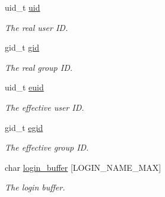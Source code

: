 \begin{DoxyCompactItemize}
\mbox{\label{structrtems__user__env__t_a6b4fe9690794c15883c40f553aa4bdaa}} 
uid\+\_\+t \mbox{\hyperlink{structrtems__user__env__t_a6b4fe9690794c15883c40f553aa4bdaa}{uid}}
\begin{DoxyCompactList}\small\item\em The real user ID. \end{DoxyCompactList}\item 
\mbox{\label{structrtems__user__env__t_a8f4fcb01f9e3d4d7a608bd7350e47106}} 
gid\+\_\+t \mbox{\hyperlink{structrtems__user__env__t_a8f4fcb01f9e3d4d7a608bd7350e47106}{gid}}
\begin{DoxyCompactList}\small\item\em The real group ID. \end{DoxyCompactList}\item 
\mbox{\label{structrtems__user__env__t_a3b6a64ef69360c611468234faf667ab4}} 
uid\+\_\+t \mbox{\hyperlink{structrtems__user__env__t_a3b6a64ef69360c611468234faf667ab4}{euid}}
\begin{DoxyCompactList}\small\item\em The effective user ID. \end{DoxyCompactList}\item 
\mbox{\label{structrtems__user__env__t_ad376433c5f4e293218a4ab38d8036b7b}} 
gid\+\_\+t \mbox{\hyperlink{structrtems__user__env__t_ad376433c5f4e293218a4ab38d8036b7b}{egid}}
\begin{DoxyCompactList}\small\item\em The effective group ID. \end{DoxyCompactList}\item 
\mbox{\label{structrtems__user__env__t_a1298798a68e1272c54cd779efb914c1e}} 
char \mbox{\hyperlink{structrtems__user__env__t_a1298798a68e1272c54cd779efb914c1e}{login\+\_\+buffer}} \mbox{[}L\+O\+G\+I\+N\+\_\+\+N\+A\+M\+E\+\_\+\+M\+AX\mbox{]}
\begin{DoxyCompactList}\small\item\em The login buffer. \end{DoxyCompactList}\item 
\mbox{\label{structrtems__user__env__t_a738ba9caf701faf094dd4653a1a574a9}} 

\end{DoxyCompactItemize}
